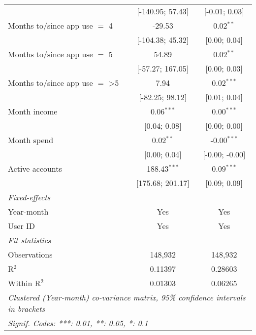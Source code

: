 \begin{table}[htbp]
\begin{threeparttable}[b]
\begin{tabular}{lcc}
                                         & [-140.95; 57.43]  & [-0.01; 0.03]\\   
         Months to/since app use $=$ 4   & -29.53            & 0.02$^{**}$\\   
                                         & [-104.38; 45.32]  & [0.00; 0.04]\\   
         Months to/since app use $=$ 5   & 54.89             & 0.02$^{**}$\\   
                                         & [-57.27; 167.05]  & [0.00; 0.03]\\   
         Months to/since app use $=$ >5  & 7.94              & 0.02$^{***}$\\   
                                         & [-82.25; 98.12]   & [0.01; 0.04]\\   
         Month income                    & 0.06$^{***}$      & 0.00$^{***}$\\   
                                         & [0.04; 0.08]      & [0.00; 0.00]\\   
         Month spend                     & 0.02$^{**}$       & -0.00$^{***}$\\   
                                         & [0.00; 0.04]      & [-0.00; -0.00]\\   
         Active accounts                 & 188.43$^{***}$    & 0.09$^{***}$\\   
                                         & [175.68; 201.17]  & [0.09; 0.09]\\   
         \midrule
         \emph{Fixed-effects}\\
         Year-month                      & Yes               & Yes\\  
         User ID                         & Yes               & Yes\\  
         \midrule
         \emph{Fit statistics}\\
         Observations                    & 148,932           & 148,932\\  
         R$^2$                           & 0.11397           & 0.28603\\  
         Within R$^2$                    & 0.01303           & 0.06265\\  
         \midrule \midrule
         \multicolumn{3}{l}{\emph{Clustered (Year-month) co-variance matrix, 95\% confidence intervals in brackets}}\\
         \multicolumn{3}{l}{\emph{Signif. Codes: ***: 0.01, **: 0.05, *: 0.1}}\\
      \end{tabular}
   \end{threeparttable}
\end{table}



